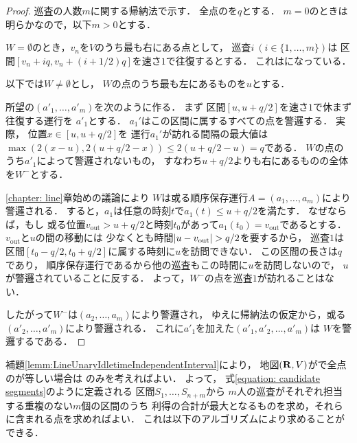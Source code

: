 \begin{proof}
  \newcommand{\leftmostpoint}{u}  %
  \newcommand{\leftmostpatroller}{巡査1}

  巡査の人数$m$に関する帰納法で示す．
  全点の{\maxIdletime}を$q$とする．
  $m = 0$のときは明らかなので，以下$m > 0$とする．

  $W = \emptyset$のとき，$v_n$を$V$のうち最も右にある点として，
  巡査$i\ (i \in \{ 1, \ldots, m \})$は
  区間$[v_n + iq, v_n + (i + 1/2)q]$を速さ$1$で往復するとする．
  これは{\sepSectPatroll}になっている．

  以下では$W \neq \emptyset$とし，
  $W$の点のうち最も左にあるものを$\leftmostpoint$とする．

  所望の{\sepSectPatroll}$(a' _1, \dots, a' _m)$を次のように作る．
  まず
  区間$[\leftmostpoint, \leftmostpoint + q/2]$を速さ$1$で休まず往復する運行を
  $a' _1$とする．
  $a_1'$はこの区間に属するすべての点を警邏する．
  実際，
  位置$x \in [u, u + q/2]$を
  運行$a_1'$が訪れる間隔の最大値は
  $ \max( 2(x - \leftmostpoint), 2(\leftmostpoint + q/2 - x) )
    \leq 2(\leftmostpoint + q/2 - \leftmostpoint) = q$である．
  $W$の点のうち$a' _1$によって警邏されないもの，
  すなわち$u + q / 2$よりも右にあるものの全体を$W ^-$とする．

  \ref{chapter: line}章始めの議論により
  $W$は或る順序保存運行$A = (a_1, \ldots, a_m)$により警邏される．
  すると，$a_1$は任意の時刻$t$で$a_1(t) \leq u + q/2$を満たす．
  \newcommand{\vout}{v_{\mathrm{out}}}
  なぜならば，もし
  或る位置$\vout > u + q/2$と時刻$t_0$があって$a_1(t_0) = \vout$であるとする．
  $\vout$と$u$の間の移動には
  少なくとも時間$\abs{u - \vout} > q / 2$を要するから，
  巡査$1$は区間$[t_0 - q / 2, t_0 + q / 2]$に属する時刻に$u$を訪問できない．
  この区間の長さは$q$であり，
  順序保存運行であるから他の巡査もこの時間に$u$を訪問しないので，
  $u$が警邏されていることに反する．
  よって，$W ^-$の点を巡査$1$が訪れることはない．

  したがって$W ^-$は$(a _2, \ldots, a _m)$により警邏され，
  ゆえに帰納法の仮定から，或る{\sepSectPatroll}$(a' _2, \ldots, a' _m)$により警邏される．
  これに$a' _1$を加えた$(a' _1, a' _2, \dots, a' _m)$は
  $W$を警邏する{\sepSectPatroll}である．
\end{proof}


補題\ref{lemm:LineUnaryIdletimeIndependentInterval}により，
地図$(\mathbf R, V)$が{\graphLine}で全点の{\maxIdletime}が等しい場合は
{\sepSectPatroll}のみを考えればよい．
よって，
式\eqref{equation: candidate segments}のように定義される
区間$S_1, \ldots, S_{n + m}$から
$m$人の巡査がそれぞれ担当する重複のない$m$個の区間のうち
利得の合計が最大となるものを求め，それらに含まれる点を求めればよい．
これは以下のアルゴリズムにより求めることができる．

